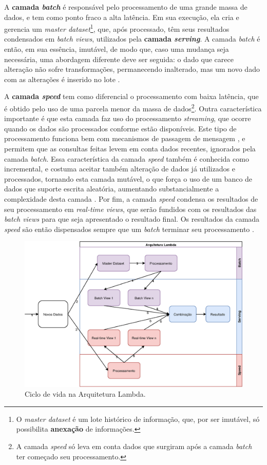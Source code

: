 A \textbf{camada \textit{batch}} é responsável pelo processamento de uma grande
massa de dados, e tem como ponto fraco a alta latência. Em sua execução, ela
cria e gerencia um \textit{master dataset}\footnote{O \textit{master dataset} é um lote
histórico de informação, que, por ser imutável, só possibilita \textbf{anexação}
de informações.}, que, após processado, têm seus resultados condensados em
\textit{batch views}, utilizados pela \textbf{camada \textit{serving}}.
A camada \textit{batch} é então, em sua essência, imutável, de modo que, caso
uma mudança seja necessária, uma abordagem diferente deve ser seguida: o dado
que carece alteração não sofre transformações, permanecendo inalterado, mas um
novo dado com as alterações é inserido no lote \cite{marz2015}.

A \textbf{camada \textit{speed}} tem como diferencial o processamento com baixa
latência, que é obtido pelo uso de uma parcela menor da massa de dados\footnote{
A camada \textit{speed} só leva em conta dados que surgiram após a camada
\textit{batch} ter começado seu processamento.}. Outra característica importante
é que esta camada faz uso do processamento \textit{streaming}, que ocorre
quando os dados são processados conforme estão disponíveis. Este tipo de
processamento funciona bem com mecanismos de passagem de mensagem
\cite{marz2015}, e permitem que as consultas feitas levem em conta dados
recentes, ignorados pela camada \textit{batch}. Essa característica da
camada \textit{speed} também é conhecida como incremental, e costuma aceitar
também alteração de dados já utilizados e processados, tornando esta camada
mutável, o que força o uso de um banco de dados que suporte escrita aleatória,
aumentando substancialmente a complexidade desta camada \cite{marz2015}. Por
fim, a camada \textit{speed} condensa os resultados de seu processamento em
\textit{real-time views}, que serão fundidos com os resultados das
\textit{batch views} para que seja apresentado o resultado final. Os resultados
da camada \textit{speed} são então dispensados sempre que um \textit{batch}
terminar seu processamento \cite{marz2015}.

\begin{figure}
  \centering
    \includegraphics[width=\textwidth]{figuras/lambda-lifecycle.eps}
  \caption{Ciclo de vida na Arquitetura Lambda.}
  \label{fig:lambda-lifecycle}
\end{figure}

